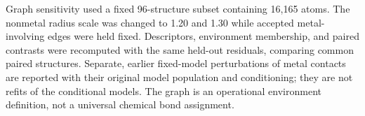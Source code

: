 Graph sensitivity used a fixed 96-structure subset containing 16,165 atoms. The nonmetal radius scale was changed to 1.20 and 1.30 while accepted metal-involving edges were held fixed. Descriptors, environment membership, and paired contrasts were recomputed with the same held-out residuals, comparing common paired structures. Separate, earlier fixed-model perturbations of metal contacts are reported with their original model population and conditioning; they are not refits of the conditional models. The graph is an operational environment definition, not a universal chemical bond assignment.
